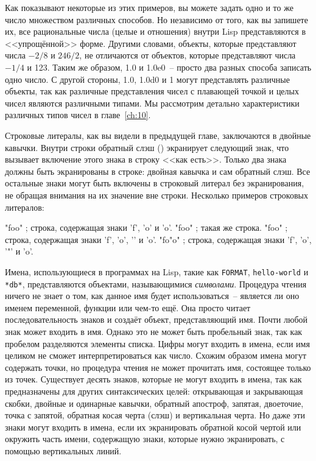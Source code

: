 Как показывают некоторые из этих примеров, вы можете задать одно и то же число множеством
различных способов. Но независимо от того, как вы запишете их, все рациональные числа
(целые и отношения) внутри Lisp представляются в <<упрощённой>> форме. Другими словами,
объекты, которые представляют числа $-2/8$ и $246/2$, не отличаются от объектов, которые
представляют числа $-1/4$ и 123. Таким же образом, 1.0 и 1.0e0~-- просто два разных способа
записать одно число. С другой стороны, 1.0, 1.0d0 и 1 могут представлять различные
объекты, так как различные представления чисел с плавающей точкой и целых чисел являются
различными типами. Мы рассмотрим детально характеристики различных типов чисел в главе~\ref{ch:10}.

Строковые литералы, как вы видели в предыдущей главе, заключаются в двойные
кавычки. Внутри строки обратный слэш (\bslash) экранирует следующий знак, что
вызывает включение этого знака в строку <<как есть>>. Только два знака должны быть
экранированы в строке: двойная кавычка и сам обратный слэш. Все остальные знаки могут быть
включены в строковый литерал без экранирования, не обращая внимания на их значение вне
строки. Несколько примеров строковых литералов:

\begin{myverb}
"foo"     ; строка, содержащая знаки 'f', 'o' и 'o'.
"fo\bslash{}o"    ; такая же строка.
"fo\bslash{}\bslash{}o"   ; строка, содержащая знаки 'f', 'o', '\bslash{}' и 'o'.
"fo\bslash{}"o"   ; строка, содержащая знаки 'f', 'o', '"' и 'o'.
\end{myverb}

Имена, использующиеся в программах на Lisp, такие как \lstinline{FORMAT}, \lstinline{hello-world}
и \lstinline{*db*}, представляются объектами, называющимися \textit{символами}. Процедура чтения
ничего не знает о том, как данное имя будет использоваться~-- является ли оно именем
переменной, функции или чем-то ещё. Она просто читает последовательность знаков и создаёт
объект, представляющий имя. Почти любой знак может входить в имя. Однако это не может быть
пробельный знак, так как пробелом разделяются элементы списка. Цифры могут входить в
имена, если имя целиком не сможет интерпретироваться как число. Схожим образом имена
могут содержать точки, но процедура чтения не может прочитать имя, состоящее только из
точек. Существует десять знаков, которые не могут входить в имена, так как предназначены
для других синтаксических целей: открывающая и закрывающая скобки, двойные и одинарные
кавычки, обратный апостроф, запятая, двоеточие, точка с запятой, обратная косая черта
(слэш) и вертикальная черта. Но даже эти знаки могут входить в имена, если их экранировать
обратной косой чертой или окружить часть имени, содержащую знаки, которые нужно
экранировать, с помощью вертикальных линий.

